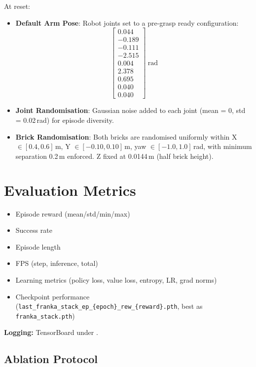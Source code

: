 \documentclass[12pt,a4paper,oneside]{report}
\begin{document}
At reset:
\begin{itemize}
    \item \textbf{Default Arm Pose}: Robot joints set to a pre-grasp ready configuration:
    \[
    \begin{bmatrix}
    0.044 \\ -0.189 \\ -0.111 \\ -2.515 \\
    0.004 \\ 2.378 \\ 0.695 \\ 0.040 \\ 0.040
    \end{bmatrix}
     \ \mathrm{rad}
    \]
    \item \textbf{Joint Randomisation}: Gaussian noise added to each joint (mean = 0, std = 0.02\,rad) for episode diversity.
    \item \textbf{Brick Randomisation}: Both bricks are randomised uniformly within X $\in [0.4, 0.6]$\,m, Y $\in [-0.10, 0.10]$\,m, yaw $\in [-1.0, 1.0]$\,rad, with minimum separation 0.2\,m enforced. Z fixed at 0.0144\,m (half brick height).
\end{itemize}

\section{Evaluation Metrics}

\begin{itemize}
    \item Episode reward (mean/std/min/max)
    \item Success rate
    \item Episode length
    \item FPS (step, inference, total)
    \item Learning metrics (policy loss, value loss, entropy, LR, grad norms)
    \item Checkpoint performance (\texttt{last\_franka\_stack\_ep\_\{epoch\}\_rew\_\{reward\}.pth}, best as \texttt{franka\_stack.pth})
\end{itemize}

\textbf{Logging:} TensorBoard under 
.

\subsection{Ablation Protocol}
\end{document}
